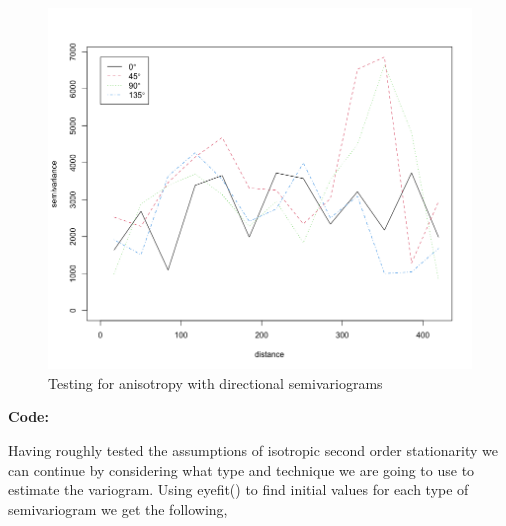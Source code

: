 \documentclass[12pt]{article}
\makeatletter
\theoremstyle{homework}
\newenvironment{exercise}[1]
{\def\@currentlabel{#1}\exercisecore}
{\endexercisecore}
\makeatother
\begin{document}
\begin{exercise}{2}
  \begin{figure}[H]
    \begin{center}
      \caption{Testing for anisotropy with directional semivariograms}
    \includegraphics[width = .75\textwidth]{Rplot03.png}
    \end{center}
  \end{figure}
  \textbf{Code:}
  \begin{center}
  
  \end{center}

  Having roughly tested the assumptions of isotropic second order stationarity we can continue by considering what type and technique we are going to use 
  to estimate the variogram. Using eyefit() to find initial values for each type of semivariogram we get the following, 
  

\end{exercise}
\end{document}

